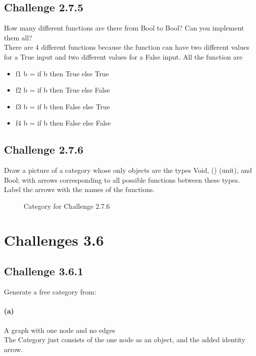 \documentclass[11pt]{article}
\begin{document}
    \subsection*{Challenge 2.7.5}
    How many different functions are there from Bool to Bool? Can
    you implement them all?\\
    There are 4 different functions because the function can have two different values for a True input and two different values for a False input. All the function are 
    \begin{itemize}
        \item f1 b = if b then True else True
        \item f2 b = if b then True else False
        \item f3 b = if b then False else True
        \item f4 b = if b then False else False
    \end{itemize}

    \subsection*{Challenge 2.7.6}
    Draw a picture of a category whose only objects are the types
    Void, () (unit), and Bool; with arrows corresponding to all possible
    functions between these types. Label the arrows with the
    names of the functions.\\
    \begin{figure*}
        \centering
        \caption{Category for Challenge 2.7.6}
    \end{figure*}


    \section*{Challenges 3.6}
    \subsection*{Challenge 3.6.1}
    Generate a free category from:
    \paragraph*{(a)} A graph with one node and no edges \\
        The Category just consists of the one node as an object, and the added identity arrow. 
\end{document}
